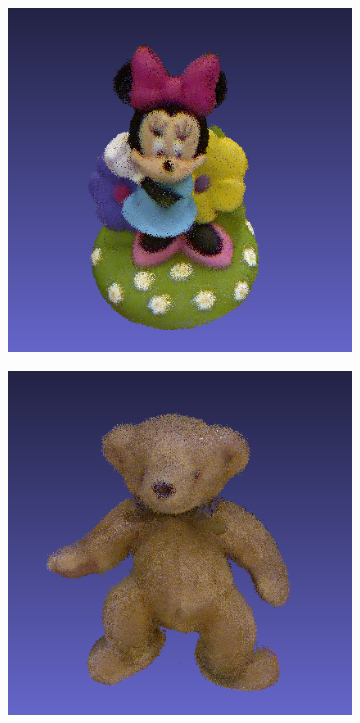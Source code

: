 \documentclass[letterpaper, 10 pt, conference]{ieeeconf}  %
\begin{document}
\begin{figure}[th]
	\centering
        \begin{subfigure}[b]{0.5\linewidth}
                \centering
                \includegraphics[width=\linewidth]{../models/mouse.png}
        \end{subfigure}%
        \begin{subfigure}[b]{0.5\linewidth}
                \centering
                \includegraphics[width=\linewidth]{../models/bear.png}
        \end{subfigure}
        

\end{figure}
\end{document}
